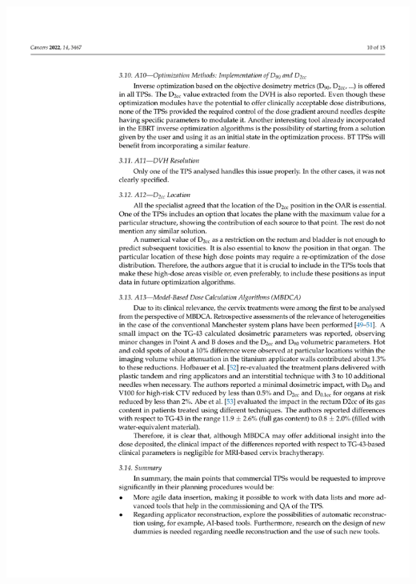 \documentclass[
  a4paper,
]{scrreprt}
\begin{document}
\includegraphics{articulos/cancers/cancers-10.png}
\end{document}
